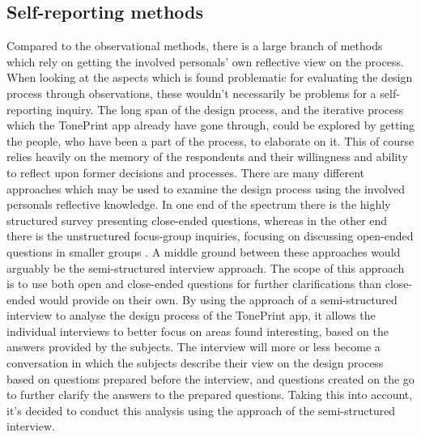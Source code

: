\subsection*{Self-reporting methods}
\label{MethodInterview}
Compared to the observational methods, there is a large branch of methods which rely on getting the involved personals' own reflective view on the process. When looking at the aspects which is found problematic for evaluating the design process through observations, these wouldn't necessarily be problems for a self-reporting inquiry. The long span of the design process, and the iterative process which the TonePrint app already have gone through, could be explored by getting the people, who have been a part of the process, to elaborate on it. This of course relies heavily on the memory of the respondents and their willingness and ability to reflect upon former decisions and processes. There are many different approaches which may be used to examine the design process using the involved personals reflective knowledge. In one end of the spectrum there is the highly structured survey presenting close-ended questions, whereas in the other end there is the unstructured focus-group inquiries, focusing on discussing open-ended questions in smaller groups \parencite{WEB:ConductingSemiStructured}. A middle ground between these approaches would arguably be the semi-structured interview approach. The scope of this approach is to use both open and close-ended questions for further clarifications than close-ended would provide on their own. By using the approach of a semi-structured interview to analyse the design process of the TonePrint app, it allows the individual interviews to better focus on areas found interesting, based on the answers provided by the subjects. The interview will more or less become a conversation in which the subjects describe their view on the design process based on questions prepared before the interview, and questions created on the go to further clarify the answers to the prepared questions. Taking this into account, it's decided to conduct this analysis using the approach of the semi-structured interview.

